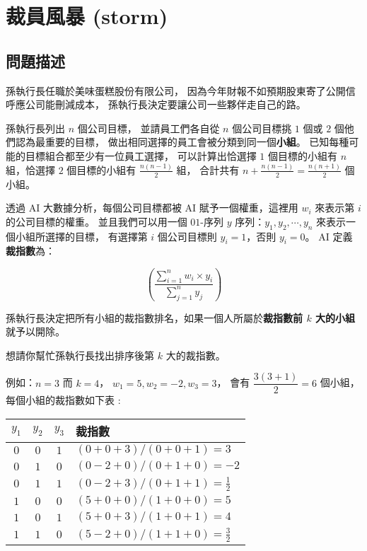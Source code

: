\section{裁員風暴 (storm)}

\subsection{問題描述}

孫執行長任職於美味蛋糕股份有限公司，
因為今年財報不如預期股東寄了公開信呼應公司能刪減成本，
孫執行長決定要讓公司一些夥伴走自己的路。

孫執行長列出 \(n\) 個公司目標， 並請員工們各自從 \(n\) 個公司目標挑
\(1\) 個或 \(2\) 個他們認為最重要的目標，
做出相同選擇的員工會被分類到同一個\textbf{小組}。
已知每種可能的目標組合都至少有一位員工選擇， 可以計算出恰選擇 \(1\)
個目標的小組有 \(n\) 組，恰選擇 \(2\) 個目標的小組有
\(\frac{n(n-1)}{2}\) 組， 合計共有
\(n + \frac{n(n-1)}{2} = \frac{n(n+1)}{2}\) 個小組。

透過 AI 大數據分析，每個公司目標都被 AI 賦予一個權重，這裡用 \(w_i\)
來表示第 \(i\) 的公司目標的權重。 並且我們可以用一個 \(01\)-序列 \(y\)
序列：\(y_1, y_2, \cdots, y_n\) 來表示一個小組所選擇的目標， 有選擇第
\(i\) 個公司目標則 \(y_i = 1\)，否則 \(y_i = 0\)。 AI
定義\textbf{裁指數}為：

\[\left( \dfrac{\displaystyle \sum_{i=1}^{n}w_i\times y_i}{\displaystyle \sum_{j=1}^{n} y_j} \right)\]

孫執行長決定把所有小組的裁指數排名，如果一個人所屬於\textbf{裁指數前
\(k\) 大的小組}就予以開除。

想請你幫忙孫執行長找出排序後第 \(k\) 大的裁指數。

例如：\(n=3\) 而 \(k=4\)， \(w_1=5, w_2=-2, w_3=3\)， 會有
\(\dfrac{3(3+1)}{2} = 6\) 個小組， 每個小組的裁指數如下表 :

\begin{longtable}[]{@{}cccl@{}}
\toprule
\(y_1\) & \(y_2\) & \(y_3\) & 裁指數 \\
\midrule
\endhead
\(0\) & \(0\) & \(1\) & \((0+0+3)/(0+0+1) = 3\) \\
\(0\) & \(1\) & \(0\) & \((0-2+0)/(0+1+0) = -2\) \\
\(0\) & \(1\) & \(1\) & \((0-2+3)/(0+1+1) = \frac{1}{2}\) \\
\(1\) & \(0\) & \(0\) & \((5+0+0)/(1+0+0) = 5\) \\
\(1\) & \(0\) & \(1\) & \((5+0+3)/(1+0+1) = 4\) \\
\(1\) & \(1\) & \(0\) & \((5-2+0)/(1+1+0) = \frac{3}{2}\) \\
\bottomrule
\end{longtable}

